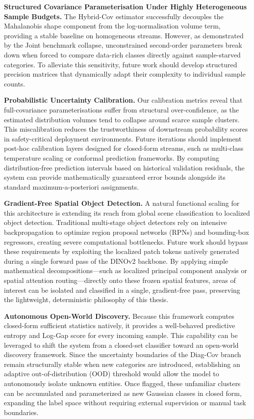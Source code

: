 \textbf{Structured Covariance Parameterisation Under Highly Heterogeneous Sample Budgets.} 
The Hybrid-Cov estimator successfully decouples the Mahalanobis shape component from the log-normalisation volume term, providing a stable baseline on homogeneous streams. However, as demonstrated by the Joint benchmark collapse, unconstrained second-order parameters break down when forced to compare data-rich classes directly against sample-starved categories. To alleviate this sensitivity, future work should develop structured precision matrices that dynamically adapt their complexity to individual sample counts.

\textbf{Probabilistic Uncertainty Calibration.} 
Our calibration metrics reveal that full-covariance parameterisations suffer from structural over-confidence, as the estimated distribution volumes tend to collapse around scarce sample clusters. This miscalibration reduces the trustworthiness of downstream probability scores in safety-critical deployment environments. Future iterations should implement post-hoc calibration layers designed for closed-form streams, such as multi-class temperature scaling or conformal prediction frameworks. By computing distribution-free prediction intervals based on historical validation residuals, the system can provide mathematically guaranteed error bounds alongside its standard maximum-a-posteriori assignments.


\textbf{Gradient-Free Spatial Object Detection.} 
A natural functional scaling for this architecture is extending its reach from global scene classification to localized object detection. Traditional multi-stage object detectors rely on intensive backpropagation to optimize region proposal networks (RPNs) and bounding-box regressors, creating severe computational bottlenecks. Future work should bypass these requirements by exploiting the localized patch tokens natively generated during a single forward pass of the DINOv2 backbone. By applying simple mathematical decompositions—such as localized principal component analysis or spatial attention routing—directly onto these frozen spatial features, areas of interest can be isolated and classified in a single, gradient-free pass, preserving the lightweight, deterministic philosophy of this thesis.

\textbf{Autonomous Open-World Discovery.} 
Because this framework computes closed-form sufficient statistics natively, it provides a well-behaved predictive entropy and Log-Gap score for every incoming sample. This capability can be leveraged to shift the system from a closed-set classifier toward an open-world discovery framework. Since the uncertainty boundaries of the Diag-Cov branch remain structurally stable when new categories are introduced, establishing an adaptive out-of-distribution (OOD) threshold would allow the model to autonomously isolate unknown entities. Once flagged, these unfamiliar clusters can be accumulated and parameterized as new Gaussian classes in closed form, expanding the label space without requiring external supervision or manual task boundaries.

